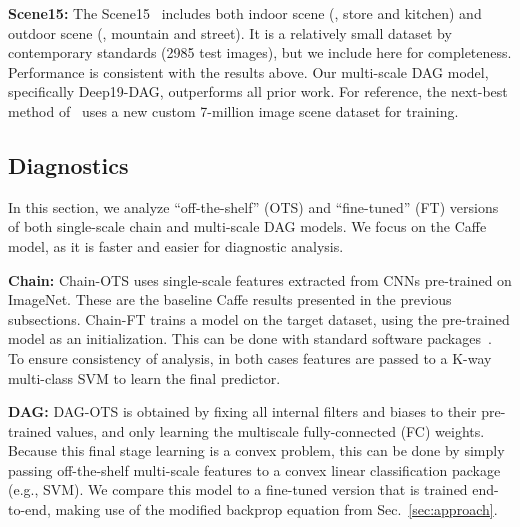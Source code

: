 \documentclass[10pt,twocolumn,letterpaper]{article}
\begin{document}
{\bf Scene15:} The Scene15~\cite{Scene15} includes both indoor scene (\eg, store and kitchen) and outdoor scene (\eg, mountain and street). It is a relatively small dataset by contemporary standards (2985 test images), but we include here for completeness. Performance is consistent with the results above. Our multi-scale DAG model, specifically Deep19-DAG, outperforms all prior work. For reference, the next-best method of~\cite{zhoulearning} uses a new custom 7-million image scene dataset for training.



\subsection{Diagnostics \label{sec:diag}}
In this section, we analyze ``off-the-shelf'' (OTS) and ``fine-tuned'' (FT) versions of both single-scale chain and multi-scale DAG models. We focus on the Caffe model, as it is faster and easier for diagnostic analysis. 

{\bf Chain:} Chain-OTS uses single-scale features extracted from CNNs pre-trained on ImageNet. These are the baseline Caffe results presented in the previous subsections. Chain-FT trains a model on the target dataset, using the pre-trained model as an initialization. This can be done with standard software packages~\cite{vedaldimatconvnet}. To ensure consistency of analysis, in both cases features are passed to a K-way multi-class SVM to learn the final predictor. %

{\bf DAG:} DAG-OTS is obtained by fixing all internal filters and biases to their pre-trained values, and only learning the multiscale fully-connected (FC) weights. Because this final stage learning is a convex problem, this can be done by simply passing off-the-shelf multi-scale features to a convex linear classification package (e.g., SVM). We compare this model to a fine-tuned version that is trained end-to-end, making use of the modified backprop equation from Sec.~\ref{sec:approach}. %
\end{document}
